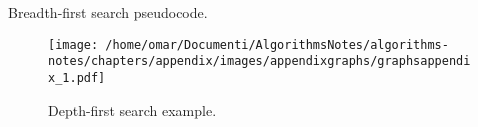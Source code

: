 \begin{algorithm}[H]
	\DontPrintSemicolon
	\LinesNumbered
\caption{Breadth-first search pseudocode.}
\end{algorithm}

\begin{figure}[H]
	\begin{center}
		\texttt{[image: /home/omar/Documenti/AlgorithmsNotes/algorithms-notes/chapters/appendix/images/appendixgraphs/graphsappendix\_1.pdf]}
		\caption[Depth-first search example.]{Depth-first search example.}
		\label{graphappendix_1}
	\end{center}
\end{figure}